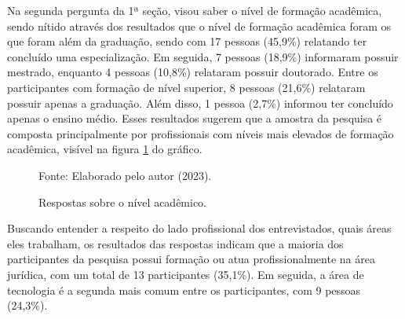 \documentclass[
	12pt,				%
	openright,			%
	oneside,			%
	a4paper,			%
	english,			%
	french,				%
	spanish,			%
	brazil,				%
	]{abntex2}
\begin{document}

Na segunda pergunta da 1ª seção, visou saber o nível de formação acadêmica, sendo nítido através dos resultados que o nível de formação acadêmica foram os que foram além da graduação, sendo com 17 pessoas (45,9\%) relatando ter concluído uma especialização. Em seguida, 7 pessoas (18,9\%) informaram possuir mestrado, enquanto 4 pessoas (10,8\%) relataram possuir doutorado. Entre os participantes com formação de nível superior, 8 pessoas (21,6\%) relataram possuir apenas a graduação. Além disso, 1 pessoa (2,7\%) informou ter concluído apenas o ensino médio. Esses resultados sugerem que a amostra da pesquisa é composta principalmente por profissionais com níveis mais elevados de formação acadêmica, visível na figura \ref{fig: grafico2} do gráfico.



\begin{figure}[ht]
    \centering
    \caption{Respostas sobre o nível acadêmico.}
    \label{fig: grafico2}
    
    \centering \small Fonte: Elaborado pelo autor (2023).
\end{figure}

Buscando entender a respeito do lado profissional dos entrevistados, quais áreas eles trabalham, os resultados das respostas indicam que a maioria dos participantes da pesquisa possui formação ou atua profissionalmente na área jurídica, com um total de 13 participantes (35,1\%). Em seguida, a área de tecnologia é a segunda mais comum entre os participantes, com 9 pessoas (24,3\%).
\end{document}
